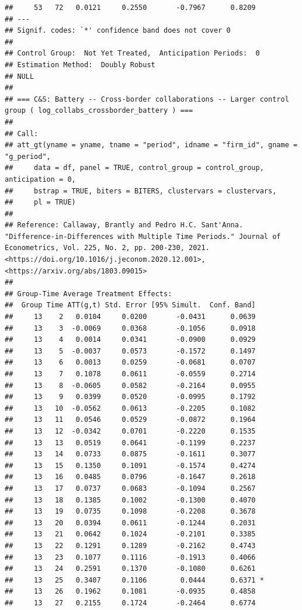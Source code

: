 \documentclass[
]{article}
\begin{document}
\begin{verbatim}
##     53   72   0.0121     0.2550       -0.7967      0.8209  
## ---
## Signif. codes: `*' confidence band does not cover 0
## 
## Control Group:  Not Yet Treated,  Anticipation Periods:  0
## Estimation Method:  Doubly Robust
## NULL
## 
## === C&S: Battery -- Cross-border collaborations -- Larger control group ( log_collabs_crossborder_battery ) ===
## 
## Call:
## att_gt(yname = yname, tname = "period", idname = "firm_id", gname = "g_period", 
##     data = df, panel = TRUE, control_group = control_group, anticipation = 0, 
##     bstrap = TRUE, biters = BITERS, clustervars = clustervars, 
##     pl = TRUE)
## 
## Reference: Callaway, Brantly and Pedro H.C. Sant'Anna.  "Difference-in-Differences with Multiple Time Periods." Journal of Econometrics, Vol. 225, No. 2, pp. 200-230, 2021. <https://doi.org/10.1016/j.jeconom.2020.12.001>, <https://arxiv.org/abs/1803.09015> 
## 
## Group-Time Average Treatment Effects:
##  Group Time ATT(g,t) Std. Error [95% Simult.  Conf. Band]  
##     13    2   0.0104     0.0200       -0.0431      0.0639  
##     13    3  -0.0069     0.0368       -0.1056      0.0918  
##     13    4   0.0014     0.0341       -0.0900      0.0929  
##     13    5  -0.0037     0.0573       -0.1572      0.1497  
##     13    6   0.0013     0.0259       -0.0681      0.0707  
##     13    7   0.1078     0.0611       -0.0559      0.2714  
##     13    8  -0.0605     0.0582       -0.2164      0.0955  
##     13    9   0.0399     0.0520       -0.0995      0.1792  
##     13   10  -0.0562     0.0613       -0.2205      0.1082  
##     13   11   0.0546     0.0529       -0.0872      0.1964  
##     13   12  -0.0342     0.0701       -0.2220      0.1535  
##     13   13   0.0519     0.0641       -0.1199      0.2237  
##     13   14   0.0733     0.0875       -0.1611      0.3077  
##     13   15   0.1350     0.1091       -0.1574      0.4274  
##     13   16   0.0485     0.0796       -0.1647      0.2618  
##     13   17   0.0737     0.0683       -0.1094      0.2567  
##     13   18   0.1385     0.1002       -0.1300      0.4070  
##     13   19   0.0735     0.1098       -0.2208      0.3678  
##     13   20   0.0394     0.0611       -0.1244      0.2031  
##     13   21   0.0642     0.1024       -0.2101      0.3385  
##     13   22   0.1291     0.1289       -0.2162      0.4743  
##     13   23   0.1077     0.1116       -0.1913      0.4066  
##     13   24   0.2591     0.1370       -0.1080      0.6261  
##     13   25   0.3407     0.1106        0.0444      0.6371 *
##     13   26   0.1962     0.1081       -0.0935      0.4858  
##     13   27   0.2155     0.1724       -0.2464      0.6774  

\end{verbatim}
\end{document}
